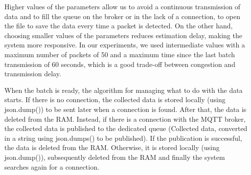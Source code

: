 Higher values of the parameters allow us to avoid a continuous transmission of data and to fill the queue on the broker or in the lack of a connection, to open the file to save the data every time a packet is detected. On the other hand, choosing smaller values of the parameters reduces estimation delay, making the system more responsive. In our experiments, we used intermediate values with a maximum number of packets of 50 and a maximum time since the last batch transmission of 60 seconds, which is a good trade-off between congestion and transmission delay.


When the batch is ready, the algorithm for managing what to do with the data starts. If there is no connection, the collected data is stored locally (using json.dump()) to be sent later when a connection is found. After that, the data is deleted from the RAM.
Instead, if there is a connection with the MQTT broker, the collected data is published to the dedicated queue (Collected data, converted in a string using json.dumps() to be published). If the publication is successful, the data is deleted from the RAM. Otherwise, it is stored locally (using json.dump()), subsequently deleted from the RAM and finally the system searches again for a connection.

